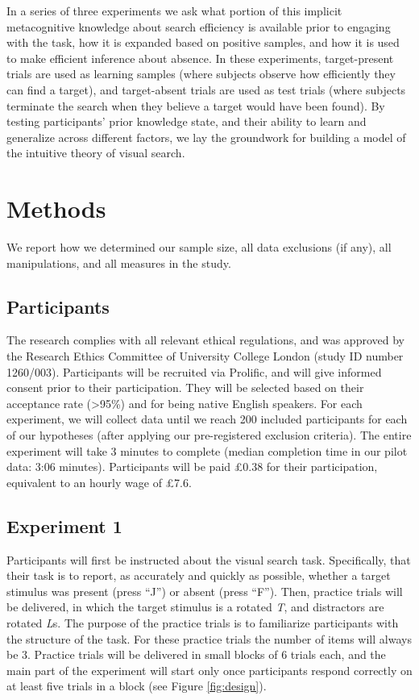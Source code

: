 \documentclass[
  english,
  man]{apa6}
\begin{document}
In a series of three experiments we ask what portion of this implicit metacognitive knowledge about search efficiency is available prior to engaging with the task, how it is expanded based on positive samples, and how it is used to make efficient inference about absence. In these experiments, target-present trials are used as learning samples (where subjects observe how efficiently they can find a target), and target-absent trials are used as test trials (where subjects terminate the search when they believe a target would have been found). By testing participants' prior knowledge state, and their ability to learn and generalize across different factors, we lay the groundwork for building a model of the intuitive theory of visual search.

\hypertarget{methods}{%
\section{Methods}\label{methods}}

We report how we determined our sample size, all data exclusions (if any), all manipulations, and all measures in the study.

\hypertarget{participants}{%
\subsection{Participants}\label{participants}}

The research complies with all relevant ethical regulations, and was approved by the Research Ethics Committee of University College London (study ID number 1260/003). Participants will be recruited via Prolific, and will give informed consent prior to their participation. They will be selected based on their acceptance rate (\textgreater95\%) and for being native English speakers. For each experiment, we will collect data until we reach 200 included participants for each of our hypotheses (after applying our pre-registered exclusion criteria). The entire experiment will take 3 minutes to complete (median completion time in our pilot data: 3:06 minutes). Participants will be paid £0.38 for their participation, equivalent to an hourly wage of £7.6.

\hypertarget{experiment-1}{%
\subsection{Experiment 1}\label{experiment-1}}

Participants will first be instructed about the visual search task. Specifically, that their task is to report, as accurately and quickly as possible, whether a target stimulus was present (press \enquote{J}) or absent (press \enquote{F}). Then, practice trials will be delivered, in which the target stimulus is a rotated \emph{T}, and distractors are rotated \emph{L}s. The purpose of the practice trials is to familiarize participants with the structure of the task. For these practice trials the number of items will always be 3. Practice trials will be delivered in small blocks of 6 trials each, and the main part of the experiment will start only once participants respond correctly on at least five trials in a block (see Figure \ref{fig:design}).
\end{document}
